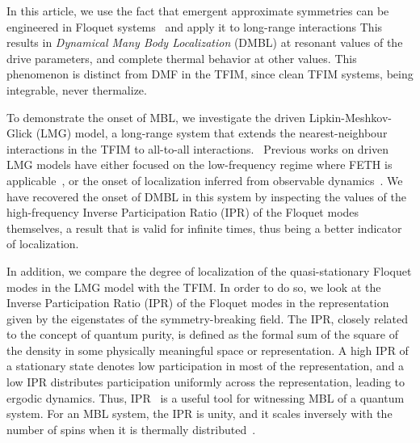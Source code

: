 \documentclass[%
reprint,
superscriptaddress,
amsmath,amssymb,
aps,
prb,
showkeys,
]{revtex4-2}
\begin{document}
In this article, {we use the fact that emergent approximate symmetries can be engineered in Floquet systems~\cite{Engelhardt2013,asmi:scars} and apply it to long-range interactions This results in \textit{Dynamical Many Body Localization} (DMBL) at resonant values of the drive parameters}, and complete thermal behavior at other values. This phenomenon is distinct from DMF in the TFIM, since clean TFIM systems, being integrable, never thermalize.

To demonstrate the onset of MBL, we investigate the driven Lipkin-Meshkov-Glick (LMG) model\cite{lmg1965_1,lmg1965_2, lmg1965_3, debergh_2001, ribeiro2008,Engelhardt2013,titum2020}, a long-range system {that extends the nearest-neighbour interactions in the TFIM to  all-to-all interactions.}~\cite{campa_statistical_2009, eisele_multiple_1988, canning_class_1992} Previous works on driven LMG models have either focused on the low-frequency regime where FETH is applicable~\cite{russomanno_thermalization_2015}, or the onset of localization inferred from observable dynamics~\cite{Engelhardt2013, lmg:fidelity, Russomanno2017}.  We have recovered the onset of DMBL in this system by inspecting the values of the high-frequency Inverse Participation Ratio (IPR) of the Floquet modes themselves, a result that is valid for infinite times, thus being a better indicator of localization.

In addition, we compare the degree of localization of the quasi-stationary Floquet modes {in the LMG model with the TFIM}. In order to do so, we look at the Inverse Participation Ratio (IPR) of the Floquet modes in the representation given by the eigenstates of the symmetry-breaking field. The IPR, closely related to the concept of quantum purity, is defined as the formal sum of the square of the density in some physically meaningful space or representation. A high IPR of a stationary state denotes low participation in most of the representation, and a low IPR distributes participation uniformly across the representation, leading to ergodic dynamics\cite{vu_fermionic_2022}. Thus, IPR~\cite{Misguich2016} is a useful tool for witnessing MBL of a quantum system. For an MBL system, the IPR is unity, and it scales inversely with the {number of spins} when it is thermally distributed~\cite{calixto_inverse_2015}.
\end{document}
